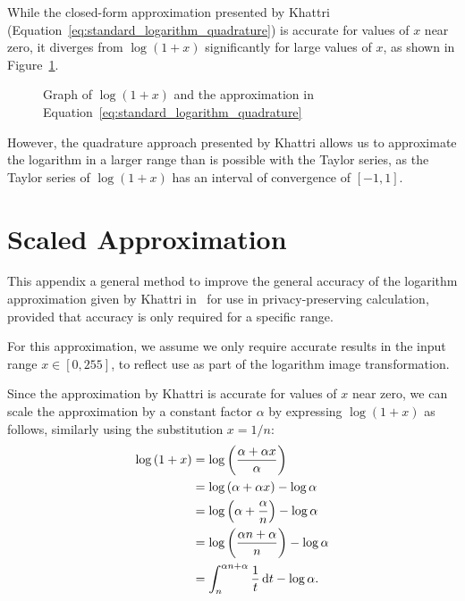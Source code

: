 While the closed-form approximation presented by Khattri (Equation~\ref{eq:standard_logarithm_quadrature}) is accurate for values of $x$ near zero, it diverges from $\log{\left(1+x\right)}$ significantly for large values of $x$, as shown in Figure~\ref{fig:standard_logarithm_quadrature}.
\begin{figure}[!ht]
	\centering
	\caption{Graph of $\log{\left(1+x\right)}$ and the approximation in Equation~\ref{eq:standard_logarithm_quadrature}}
	\label{fig:standard_logarithm_quadrature}
\end{figure}

However, the quadrature approach presented by Khattri allows us to approximate the logarithm in a larger range than is possible with the Taylor series, as the Taylor series of $\log\left(1+x\right)$ has an interval of convergence of $[-1,1]$.

\section{Scaled Approximation}
\label{sec:logarithm_approximation}
This appendix a general method to improve the general accuracy of the logarithm approximation given by Khattri in~\cite{khattri_new_2009} for use in privacy-preserving calculation, provided that accuracy is only required for a specific range.

For this approximation, we assume we only require accurate results in the input range $x \in [0, 255]$, to reflect use as part of the logarithm image transformation.

Since the approximation by Khattri is accurate for values of $x$ near zero, we can scale the approximation by a constant factor $\alpha$ by expressing $\log(1+x)$ as follows, similarly using the substitution $x=1/n$:
\begin{align*}
	\log{\left(1+x\right)} &= \log{\left(\frac{\alpha + \alpha x}{\alpha}\right)}\\
	&= \log{(\alpha + \alpha x)} - \log{\alpha}\\
	&= \log{\left(\alpha+\frac{\alpha}{n}\right)} - \log{\alpha}\\
	&= \log{\left(\frac{\alpha n + \alpha}{n}\right)} - \log{\alpha}\\
	&= \int_{n}^{\alpha n + \alpha}{\frac{1}{t}\mathop{}\!\mathrm{d} t} - \log{\alpha}.
\end{align*}

